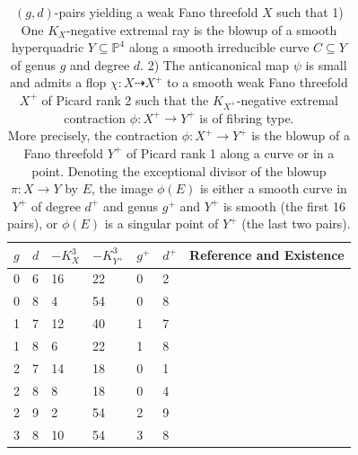 \documentclass[english,11pt,reqno]{amsart}
\newcommand{\sub}{\subseteq}
\newcommand{\Pfour}{\mathbb{P}^4}
\begin{document}
\begin{table}[H] \label{table:Sarkisov_link_divisorial}
\caption{$(g,d)$-pairs yielding a weak Fano threefold $X$ such that 1) One $K_X$-negative extremal ray is the blowup of a smooth hyperquadric $Y\sub \Pfour$ along a smooth irreducible curve $C\sub Y$ of genus $g$ and degree $d$. 2) The anticanonical map $\psi$ is small and admits a flop $\chi:X\dashrightarrow X^+$ to a smooth weak Fano threefold $X^+$ of Picard rank 2 such that the $K_{X^+}$-negative extremal contraction $\phi:X^+\rightarrow Y^+$ is of fibring type.\\
More precisely, the contraction $\phi:X^+\rightarrow Y^+$ is the blowup of a Fano threefold $Y^+$ of Picard rank 1 along a curve or in a point. Denoting the exceptional divisor of the blowup $\pi:X\rightarrow Y$ by $E$, the image $\phi(E)$ is either a smooth curve in $Y^+$ of degree $d^+$ and genus $g^+$ and $Y^+$ is smooth (the first 16 pairs), or $\phi(E)$ is a singular point of $Y^+$ (the last two pairs). 
}
\label{table:anticanonical_map_small_flopped_extremal_contraction_divisorial}
\begin{minipage}[h]{\textwidth}
\vspace{5pt}
\centering
\begin{tabular}{|l|l|l|l|l|l|l|}
\hline
$g$ & $d$ & $-K_X^3$ & $-K_{Y^+}^3$ & $g^+$ & $d^+$ & Reference and Existence\\
\hline
0 & 6 & 16 & 22 & 0 & 2 & \cite[(2.8)]{Takeuchi_Some_birational_maps} \\
\hline
0 & 8 & 4 & 54 & 0 & 8 & \cite[No.\ 71, Thm.\ 3.2]{Arap_Cutrone_Marshburn_weak_Fano_threefolds_Existence} \\
\hline
1 & 7 & 12 & 40 & 1 & 7 & \cite[No.\ 105, Thm.\ 3.2]{Arap_Cutrone_Marshburn_weak_Fano_threefolds_Existence} \\
\hline
1 & 8 & 6 & 22 & 1 & 8 & \cite[No.\ 86, Thm.\ 3.2]{Arap_Cutrone_Marshburn_weak_Fano_threefolds_Existence} \\
\hline
2 & 7 & 14 & 18 & 0 & 1 & \cite[Thm.\ 4.3.3(vii) + Thm.\ 4.3.7(ii) ]{Shafarevich_Parshin_AlgGeom_Fano_varieties} \\
\hline
2 & 8 & 8 & 18 & 0 & 4 & \cite[No.\ 97, Thm.\ 3.2]{Arap_Cutrone_Marshburn_weak_Fano_threefolds_Existence} \\
\hline
2 & 9 & 2 & 54 & 2 & 9 & \cite[No.\ 44, Thm.\ 3.2]{Arap_Cutrone_Marshburn_weak_Fano_threefolds_Existence}\\ 
\hline
3 & 8 & 10 & 54 & 3 & 8 & \cite[No.\ 102, Thm.\ 4.1]{Cutrone_Marshburn_Update} \\

\end{tabular}
\end{minipage}
\end{table}
\end{document}
